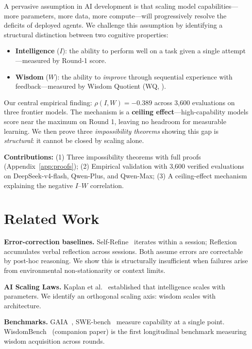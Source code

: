 \documentclass{article}
\begin{document}
A pervasive assumption in AI development is that scaling model capabilities---more
parameters, more data, more compute---will progressively resolve the deficits of
deployed agents. We challenge this assumption by identifying a structural distinction
between two cognitive properties:

\begin{itemize}[nosep,leftmargin=*]
  \item \textbf{Intelligence} ($I$): the ability to perform well on a task given
    a single attempt---measured by Round-1 score.
  \item \textbf{Wisdom} ($W$): the ability to \emph{improve} through sequential
    experience with feedback---measured by Wisdom Quotient (WQ,
    \cite{anon_wisdombench}).
\end{itemize}

Our central empirical finding: $\rho(I, W) = -0.389$ across 3,600 evaluations
on three frontier models. The mechanism is a \textbf{ceiling effect}---high-capability
models score near the maximum on Round 1, leaving no headroom for measurable learning.
We then prove three \emph{impossibility theorems} showing this gap is \emph{structural}:
it cannot be closed by scaling alone.

\textbf{Contributions:} (1) Three impossibility theorems with full proofs (Appendix~\ref{app:proofs});
(2) Empirical validation with 3,600 verified evaluations on DeepSeek-v4-flash,
Qwen-Plus, and Qwen-Max; (3) A ceiling-effect mechanism explaining the negative $I$--$W$ correlation.

\section{Related Work}

\textbf{Error-correction baselines.}
Self-Refine~\cite{self_refine} iterates within a session; Reflexion~\cite{reflexion}
accumulates verbal reflection across sessions. Both assume errors are correctable
by post-hoc reasoning. We show this is structurally insufficient when failures
arise from environmental non-stationarity or context limits.

\textbf{AI Scaling Laws.}
Kaplan et al.~\cite{kaplan2020} established that intelligence scales with parameters.
We identify an orthogonal scaling axis: wisdom scales with architecture.

\textbf{Benchmarks.}
GAIA~\cite{gaia}, SWE-bench~\cite{swebench} measure capability at a single point.
WisdomBench~\cite{anon_wisdombench} (companion paper) is the first longitudinal
benchmark measuring wisdom acquisition across rounds.
\end{document}
